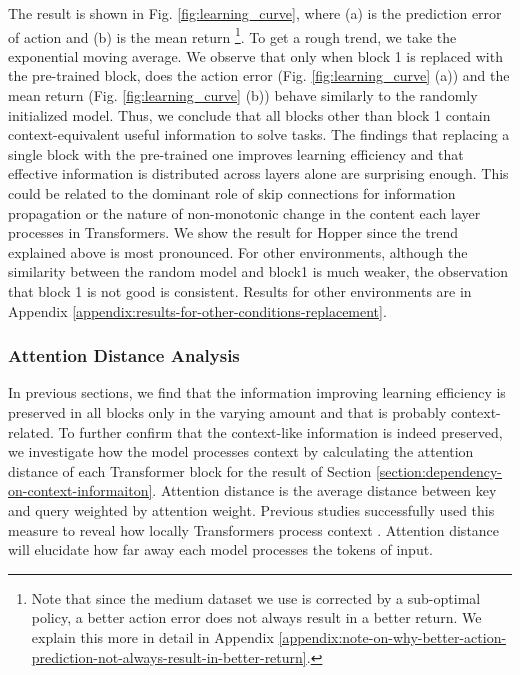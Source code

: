 The result is shown in Fig. \ref{fig:learning_curve}, where (a) is the prediction error of action and (b) is the mean return 
\footnote{
Note that since the medium dataset we use is corrected by a sub-optimal policy, a better action error does not always result in a better return. We explain this more in detail in Appendix \ref{appendix:note-on-why-better-action-prediction-not-always-result-in-better-return}.
}. 
To get a rough trend, we take the exponential moving average. We observe that only when block 1 is replaced with the pre-trained block, does the action error (Fig. \ref{fig:learning_curve} (a)) and the mean return (Fig. \ref{fig:learning_curve} (b)) behave similarly to the randomly initialized model. Thus, we conclude that all blocks other than block 1 contain context-equivalent useful information to solve tasks. The findings that replacing a single block with the pre-trained one improves learning efficiency and that effective information is distributed across layers alone are surprising enough. This could be related to the dominant role of skip connections for information propagation \cite{raghu2021vision} or the nature of non-monotonic change in the content each layer processes \cite{liu-etal-2019-linguistic} in Transformers. We show the result for Hopper since the trend explained above is most pronounced. For other environments, although the similarity between the random model and block1 is much weaker, the observation that block 1 is not good is consistent. Results for other environments are in Appendix \ref{appendix:results-for-other-conditions-replacement}.

\subsubsection{Attention Distance Analysis}
\label{section:attention-distance}
In previous sections, we find that the information improving learning efficiency is preserved in all blocks only in the varying amount and that is probably context-related. To further confirm that the context-like information is indeed preserved, we investigate how the model processes context by calculating the attention distance \cite{dosovitskiy2020image} of each Transformer block for the result of Section \ref{section:dependency-on-context-informaiton}. Attention distance is the average distance between key and query weighted by attention weight. Previous studies successfully used this measure to reveal how locally Transformers process context \cite{raghu2021vision,dosovitskiy2020image}. Attention distance will elucidate how far away each model processes the tokens of input.

